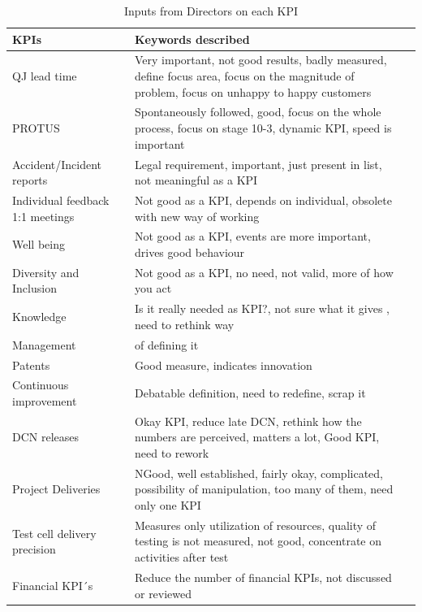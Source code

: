 \begin{enumerate}
\begin{table}[H]
    \centering
    \captionsetup{justification=centering, margin=2cm}
    \label{storage}
    \begin{tabular}{|p{4cm}|p{10cm}|c|} \hline
    \textbf{KPIs} & \textbf{Keywords described}\\
    \hline
     QJ lead time \vfill \hfill& Very important, not good results, badly measured, define focus area, focus on the magnitude of problem, focus on unhappy to happy customers\\\hline
     PROTUS & Spontaneously followed, good, focus on the whole process, focus on stage 10-3, dynamic KPI, speed is important \vfill \hfill\\\hline
     Accident/Incident reports & Legal requirement, important, just present in list, not meaningful as a KPI\\\hline
     Individual feedback 1:1 meetings & Not good as a KPI, depends on individual, obsolete with new way of working \\\hline
     Well being & Not good as a KPI, events are more important, drives good behaviour \\\hline
     Diversity and Inclusion & Not good as a KPI, no need, not valid, more of how you act\\\hline
     Knowledge & Is it really needed as KPI?, not sure what it gives , need to rethink way \\\hline
     Management & of defining it \\\hline
     Patents & Good measure, indicates innovation \\\hline
     Continuous improvement & Debatable definition, need to redefine, scrap it \\\hline
     DCN releases & Okay KPI, reduce late DCN, rethink how the numbers are perceived, matters a lot, Good KPI, need to rework \\\hline
     Project Deliveries & NGood, well established, fairly okay, complicated, possibility of manipulation, too many of them, need only one KPI \\\hline
     Test cell delivery precision & Measures only utilization of resources, quality of testing is not measured, not good, concentrate on activities after test\\\hline
     Financial KPI´s & Reduce the number of financial KPIs, not discussed or reviewed\\\hline
    \end{tabular}%
    \caption{Inputs from Directors on each KPI}
   \label{tab:Inputs}
\end{table}\\


\end{enumerate}
